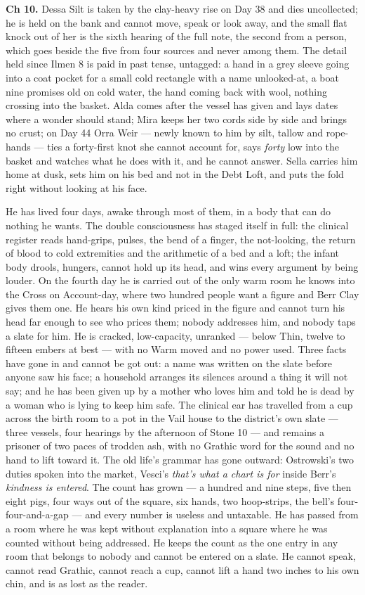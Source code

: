 \documentclass{design/chronicle}
\begin{document}
{\textbf{Ch 10.} Dessa Silt is taken by the clay-heavy rise on Day 38 and dies uncollected; he is held on the bank and cannot move, speak or look away, and the small flat knock out of her is the sixth hearing of the full note, the second from a person, which goes beside the five from four sources and never among them. The detail held since Ilmen 8 is paid in past tense, untagged: a hand in a grey sleeve going into a coat pocket for a small cold rectangle with a name unlooked-at, a boat nine promises old on cold water, the hand coming back with wool, nothing crossing into the basket. Alda comes after the vessel has given and lays dates where a wonder should stand; Mira keeps her two cords side by side and brings no crust; on Day 44 Orra Weir --- newly known to him by silt, tallow and rope-hands --- ties a forty-first knot she cannot account for, says \emph{forty} low into the basket and watches what he does with it, and he cannot answer. Sella carries him home at dusk, sets him on his bed and not in the Debt Loft, and puts the fold right without looking at his face.

He has lived four days, awake through most of them, in a body that can do nothing he wants. The double consciousness has staged itself in full: the clinical register reads hand-grips, pulses, the bend of a finger, the not-looking, the return of blood to cold extremities and the arithmetic of a bed and a loft; the infant body drools, hungers, cannot hold up its head, and wins every argument by being louder. On the fourth day he is carried out of the only warm room he knows into the Cross on Account-day, where two hundred people want a figure and Berr Clay gives them one. He hears his own kind priced in the figure and cannot turn his head far enough to see who prices them; nobody addresses him, and nobody taps a slate for him. He is cracked, low-capacity, unranked --- below Thin, twelve to fifteen embers at best --- with no Warm moved and no power used. Three facts have gone in and cannot be got out: a name was written on the slate before anyone saw his face; a household arranges its silences around a thing it will not say; and he has been given up by a mother who loves him and told he is dead by a woman who is lying to keep him safe. The clinical ear has travelled from a cup across the birth room to a pot in the Vail house to the district’s own slate --- three vessels, four hearings by the afternoon of Stone 10 --- and remains a prisoner of two paces of trodden ash, with no Grathic word for the sound and no hand to lift toward it. The old life’s grammar has gone outward: Ostrowski’s two duties spoken into the market, Vesci’s \emph{that’s what a chart is for} inside Berr’s \emph{kindness is entered}. The count has grown --- a hundred and nine steps, five then eight pigs, four ways out of the square, six hands, two hoop-strips, the bell’s four-four-and-a-gap --- and every number is useless and untaxable. He has passed from a room where he was kept without explanation into a square where he was counted without being addressed. He keeps the count as the one entry in any room that belongs to nobody and cannot be entered on a slate. He cannot speak, cannot read Grathic, cannot reach a cup, cannot lift a hand two inches to his own chin, and is as lost as the reader.

}
\end{document}
